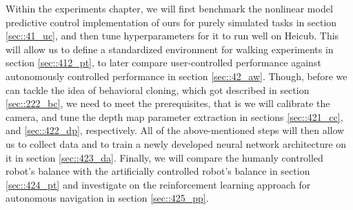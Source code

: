 \label{sec::4_ex}
Within the experiments chapter, we will first benchmark the nonlinear model predictive control implementation of ours for purely simulated tasks in section \ref{sec::41_uc}, and then tune hyperparameters for it to run well on Heicub. This will allow us to define a standardized environment for walking experiments in section \ref{sec::412_pt}, to later compare user-controlled performance against autonomously controlled performance in section \ref{sec::42_aw}. Though, before we can tackle the idea of behavioral cloning, which got described in section \ref{sec::222_bc}, we need to meet the prerequisites, that is we will calibrate the camera, and tune the depth map parameter extraction in sections \ref{sec::421_cc}, and \ref{sec::422_dp}, respectively. All of the above-mentioned steps will then allow us to collect data and to train a newly developed neural network architecture on it in section \ref{sec::423_da}. Finally, we will compare the humanly controlled robot's balance with the artificially controlled robot's balance in section \ref{sec::424_pt} and investigate on the reinforcement learning approach for autonomous navigation in section \ref{sec::425_pp}.